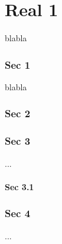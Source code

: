 \documentclass{minimal}
\begin{document}
\part{Real 1}


blabla
\section{Sec 1}
blabla

\section{Sec 2}


\section{Sec 3}
...

\subsection{Sec 3.1}


\section{Sec 4}
...
\end{document}
